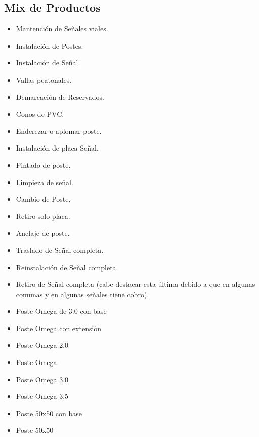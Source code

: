	\subsection{Mix de Productos}
	\begin{itemize}
	\item Mantención de Señales viales.
	\item Instalación de Postes.
	\item Instalación de Señal.
	\item Vallas peatonales.
	\item Demarcación de Reservados. 
	\item Conos de PVC.
	\end{itemize}
	
	\vspace{5mm}
	\vspace{3mm} 
	\vspace{3mm}
	\begin{itemize}
	\item Enderezar o aplomar poste. 
	\item Instalación de placa Señal. 
	\item Pintado de poste.
	\item Limpieza de señal.
	\item Cambio de Poste.
	\item Retiro solo placa.
	\item Anclaje de poste.
	\item Traslado de Señal completa.
	\item Reinstalación de Señal completa.
	\item Retiro de Señal completa (cabe destacar esta última debido a que en algunas comunas y en algunas señales tiene cobro). 
	\end{itemize}
	
	\vspace{5mm}
	\vspace{3mm}
	\begin{itemize}
	\item Poste Omega de 3.0 con base
	\item Poste Omega con extensión
	\item Poste Omega 2.0
	\item Poste Omega
	\item Poste Omega 3.0
	\item Poste Omega 3.5
	\item Poste 50x50 con base
	\item Poste 50x50
	\end{itemize}
	
